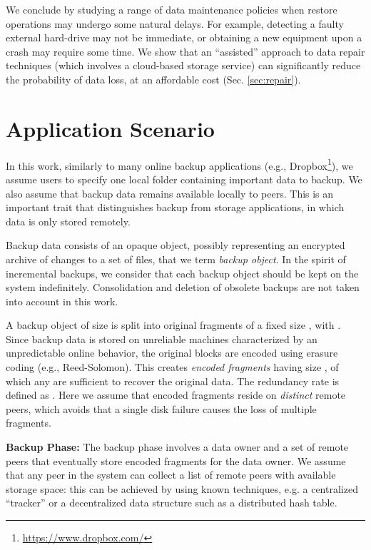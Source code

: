 \documentclass[conference,10pt]{IEEEtran}
\begin{document}
We conclude by studying a range of data maintenance policies when
restore operations may undergo some natural delays. For example,
detecting a faulty external hard-drive may not be immediate, or
obtaining a new equipment upon a crash may require some time. We show
that an ``assisted'' approach to data repair techniques (which
involves a cloud-based storage service) can significantly reduce the
probability of data loss, at an affordable cost (Sec. \ref{sec:repair}).

\section{Application Scenario}
\label{sec:background}

In this work, similarly to many online backup applications (e.g.,
Dropbox\footnote{\url{https://www.dropbox.com/}}), we assume users to
specify one local folder containing important data to backup. We also
assume that backup data remains available locally to peers. This is an
important trait that distinguishes backup from storage applications,
in which data is only stored remotely.

Backup data consists of an opaque object, possibly representing an
encrypted archive of changes to a set of files, that we
term \emph{backup object}. In the spirit of incremental backups, we
consider that each backup object should be kept on the system
indefinitely. Consolidation and deletion of obsolete backups are not
taken into account in this work.

A backup object of size  is split into  original fragments of a
fixed size , with . Since backup data is stored on
unreliable machines characterized by an unpredictable online behavior,
the original  blocks are encoded using erasure coding (e.g.,
Reed-Solomon). This creates  \emph{encoded fragments} having size
, of which any  are sufficient to recover the original data. The
redundancy rate is defined as . Here we assume that encoded
fragments reside on \emph{distinct} remote peers, which avoids that a
single disk failure causes the loss of multiple fragments.

\noindent \textbf{Backup Phase:} The backup phase involves a data
owner and a set of remote peers that eventually store encoded
fragments for the data owner. We assume that any peer in the system
can collect a list of remote peers with available storage space: this
can be achieved by using known techniques, e.g. a centralized
``tracker'' or a decentralized data structure such as a distributed
hash table.
\end{document}
